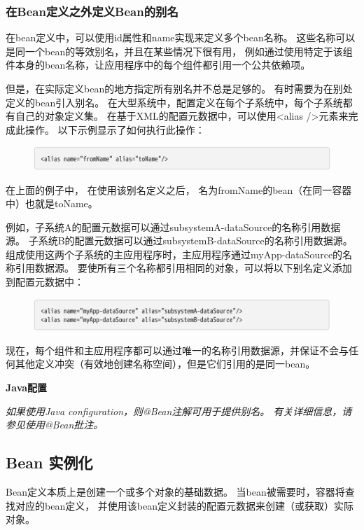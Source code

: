 \subsubsection{在Bean定义之外定义Bean的别名}
在bean定义中，可以使用id属性和name实现来定义多个bean名称。
这些名称可以是同一个bean的等效别名，并且在某些情况下很有用，
例如通过使用特定于该组件本身的bean名称，让应用程序中的每个组件都引用一个公共依赖项。

但是，在实际定义bean的地方指定所有别名并不总是足够的。 
有时需要为在别处定义的bean引入别名。 
在大型系统中，配置定义在每个子系统中，每个子系统都有自己的对象定义集。 
在基于XML的配置元数据中，可以使用<alias />元素来完成此操作。 
以下示例显示了如何执行此操作：

\begin{figure}[ht]
    \centering
    \includegraphics[width=1\linewidth]{./Figure/IMG_code_12.png}
\end{figure}
在上面的例子中，
在使用该别名定义之后，
名为fromName的bean（在同一容器中）也就是toName。

例如，子系统A的配置元数据可以通过subsystemA-dataSource的名称引用数据源。 
子系统B的配置元数据可以通过subsystemB-dataSource的名称引用数据源。 
组成使用这两个子系统的主应用程序时，主应用程序通过myApp-dataSource的名称引用数据源。
要使所有三个名称都引用相同的对象，可以将以下别名定义添加到配置元数据中：

\begin{figure}[ht]
    \centering
    \includegraphics[width=1\linewidth]{./Figure/IMG_code_13.png}
\end{figure}

现在，每个组件和主应用程序都可以通过唯一的名称引用数据源，并保证不会与任何其他定义冲突（有效地创建名称空间），但是它们引用的是同一bean。

\begin{center}
    \textbf{Java配置}
\end{center}

\textit{如果使用Java configuration，则@Bean注解可用于提供别名。 有关详细信息，请参见使用@Bean批注。}

\subsection{Bean 实例化}
Bean定义本质上是创建一个或多个对象的基础数据。 
当bean被需要时，容器将查找对应的bean定义，
并使用该bean定义封装的配置元数据来创建（或获取）实际对象。


